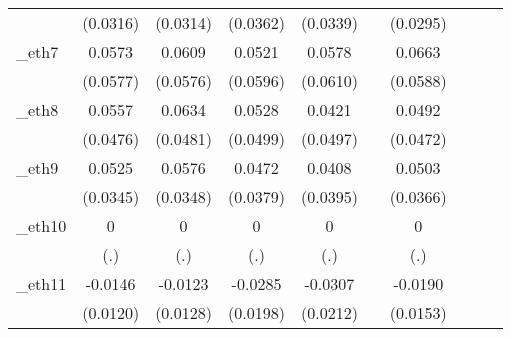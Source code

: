 \begin{table}[htbp]
\begin{tabular}{l*{9}{c}}
            &    (0.0316)         &    (0.0314)         &    (0.0362)         &    (0.0339)         &                     &    (0.0295)         &                     &                     &                     \\
[1em]
\_eth7       &      0.0573         &      0.0609         &      0.0521         &      0.0578         &                     &      0.0663         &                     &                     &                     \\
            &    (0.0577)         &    (0.0576)         &    (0.0596)         &    (0.0610)         &                     &    (0.0588)         &                     &                     &                     \\
[1em]
\_eth8       &      0.0557         &      0.0634         &      0.0528         &      0.0421         &                     &      0.0492         &                     &                     &                     \\
            &    (0.0476)         &    (0.0481)         &    (0.0499)         &    (0.0497)         &                     &    (0.0472)         &                     &                     &                     \\
[1em]
\_eth9       &      0.0525         &      0.0576\sym{*}  &      0.0472         &      0.0408         &                     &      0.0503         &                     &                     &                     \\
            &    (0.0345)         &    (0.0348)         &    (0.0379)         &    (0.0395)         &                     &    (0.0366)         &                     &                     &                     \\
[1em]
\_eth10      &           0         &           0         &           0         &           0         &                     &           0         &                     &                     &                     \\
            &         (.)         &         (.)         &         (.)         &         (.)         &                     &         (.)         &                     &                     &                     \\
[1em]
\_eth11      &     -0.0146         &     -0.0123         &     -0.0285         &     -0.0307         &                     &     -0.0190         &                     &                     &                     \\
            &    (0.0120)         &    (0.0128)         &    (0.0198)         &    (0.0212)         &                     &    (0.0153)         &                     &                     &                     \\

\end{tabular}
\end{table}
